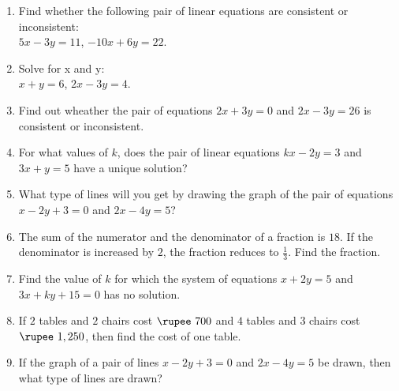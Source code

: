 \documentclass{article}
\begin{document}
\begin{enumerate}
    \item Find whether the following pair of linear equations are consistent or inconsistent:\\
    \hspace*{2cm} $5x - 3y = 11$, $-10x + 6y = 22$.
    
    \item Solve for x and y:\\
    \hspace*{2cm} $x + y = 6$, $2x - 3y = 4$.\\
    \item Find out wheather the pair of equations $2x + 3y = 0$ and $2x - 3y = 26$ is consistent or inconsistent.
    
    \item For what values of $k$, does the pair of linear equations $kx - 2y = 3$ and $3x + y = 5$ have a unique solution?
    
    \item What type of lines will you get by drawing the graph of the pair of equations $x - 2y + 3 = 0$ and $2x - 4y = 5$?
    
    \item The sum of the numerator and the denominator of a fraction is $18$. If the denominator is increased by $2$, the fraction reduces to $\frac{1}{3}$. Find the fraction.
    
    \item Find the value of $k$ for which the system of equations $x + 2y = 5$ and $3x + ky + 15 = 0$ has no solution.
    
    \item If $2$ tables and $2$ chairs cost $\rupee~700$ and $4$ tables and $3$ chairs cost $\rupee~1,250$, then find the cost of one table.
    
    \item If the graph of a pair of lines $x - 2y + 3 = 0$ and $2x - 4y = 5$ be drawn, then what type of lines are drawn?
    

\end{enumerate}
\end{document}
